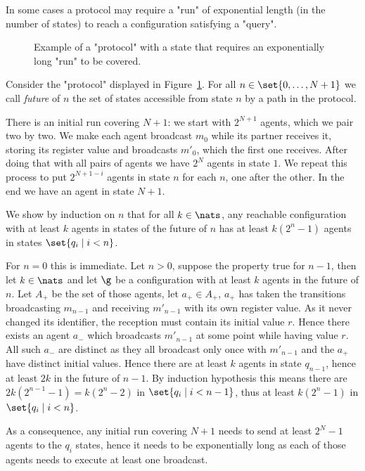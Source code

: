 \begin{ex}
	In some cases a protocol may require a "run" of exponential length (in the number of states) to reach a configuration satisfying a "query".
	
	\begin{figure}[h]
		
		\label{fig:exp-run}
		\caption{Example of a "protocol" with a state that requires an exponentially long "run" to be covered.}
	\end{figure}

	Consider the "protocol" displayed in Figure~\ref{fig:exp-run}. 
	For all $n \in \set{0, \ldots, N+1}$ we call \emph{future} of $n$ the set of states accessible from state $n$ by a path in the protocol.
	
	There is an initial run covering $N+1$: we start with $2^{N+1}$ agents, which we pair two by two. We make each agent broadcast $m_0$ while its partner receives it, storing its register value and broadcasts $m'_0$, which the first one receives. After doing that with all pairs of agents we have $2^{N}$ agents in state $1$.
	We repeat this process to put $2^{N+1-i}$ agents in state $n$ for each $n$, one after the other. In the end we have an agent in state $N+1$.
	
	We show by induction on $n$ that for all $k \in \nats$, any reachable configuration with at least $k$ agents in states of the future of $n$ has at least $k(2^n-1)$ agents in states $\set{q_i \mid i<n}$.
	
	For $n=0$ this is immediate. Let $n>0$, suppose the property true for $n-1$, then let $k \in \nats$ and let $\g$ be a configuration with at least $k$ agents in the future of $n$. Let $A_+$ be the set of those agents, let $a_+ \in A_+$, $a_+$ has taken the transitions broadcasting $m_{n-1}$ and receiving $m'_{n-1}$ with its own register value. As it never changed its identifier, the reception must contain its initial value $r$. Hence there exists an agent $a_-$ which broadcasts $m'_{n-1}$ at some point while having value $r$. All such $a_-$ are distinct as they all broadcast only once with $m'_{n-1}$ and the $a_+$ have distinct initial values.
	Hence there are at least $k$ agents in state $q_{n-1}$, hence at least $2k$ in the future of $n-1$. By induction hypothesis this means there are $2k(2^{n-1}-1) = k(2^n-2)$ in $\set{q_i \mid i<n-1}$, thus at least $k(2^n-1)$ in $\set{q_i \mid i<n}$.
	
	As a consequence, any initial run covering $N+1$ needs to send at least $2^N-1$ agents to the $q_i$ states, hence it needs to be exponentially long as each of those agents needs to execute at least one broadcast.
\end{ex}

